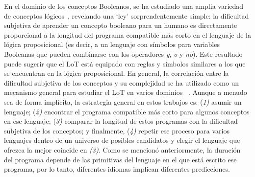 
En el dominio de los conceptos Booleanos, se ha estudiado una amplia variedad de conceptos lógicos~\cite{feldman2003simplicity}, revelando una `ley' sorprendentemente simple: la dificultad subjetiva de aprender un concepto booleano para un humano es directamente proporcional a la longitud del programa compatible más corto en el lenguaje de la lógica proposicional (es decir, a un lenguaje con símbolos para variables Booleanas que pueden combinarse con los operadores \textit{y}, \textit{o} y \textit{no}). Este resultado puede sugerir que el LoT está equipado con reglas y símbolos similares a los que se encuentran en la lógica proposicional. En general, la correlación entre la dificultad subjetiva de los conceptos y su complejidad se ha utilizado como un mecanismo general para estudiar el LoT en varios dominios ~\cite{piantadosi2016logical,leeuwenberg1971perceptual,amalric2017language,romano2018,lupyan2007language}. Aunque a menudo sea de forma implícita, la estrategia general en estos trabajos es: (\textit{1)} asumir un lenguaje; (\textit{2)} encontrar el programa compatible más corto para algunos conceptos en ese lenguaje; (\textit{3)} comparar la longitud de estos programas con la dificultad subjetiva de los conceptos; y finalmente, (\textit{4)} repetir ese proceso para varios lenguajes dentro de un universo de posibles candidatos y elegir el lenguaje que ofrezca la mejor coincide en \textit{(3)}. Como se mencionó anteriormente, la duración del programa depende de las primitivas del lenguaje en el que está escrito ese programa, por lo tanto, diferentes idiomas implican diferentes predicciones.

